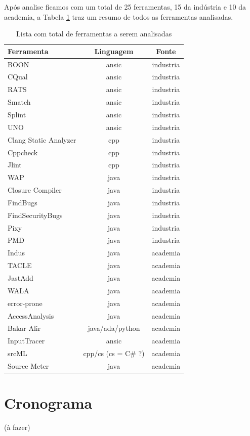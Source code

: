 \documentclass[qual, classic, a4paper]{ufbathesis}
\begin{document}

Após analise ficamos com um total de 25 ferramentas, 15 da indústria e 10 da
academia, a Tabela \ref{total-de-ferramentas} traz um resumo de todos as
ferramentas analisadas.

\begin{table}
\caption{Lista com total de ferramentas a serem analisadas}
\centering
\begin{tabular}{| l | c | c |}
\hline
Ferramenta & Linguagem & Fonte \\
\hline
BOON                  & ansic                & industria \\
CQual                 & ansic                & industria \\
RATS                  & ansic                & industria \\
Smatch                & ansic                & industria \\
Splint                & ansic                & industria \\
UNO                   & ansic                & industria \\
Clang Static Analyzer & cpp                  & industria \\
Cppcheck              & cpp                  & industria \\
Jlint                 & cpp                  & industria \\
WAP                   & java                 & industria \\
Closure Compiler      & java                 & industria \\
FindBugs              & java                 & industria \\
FindSecurityBugs      & java                 & industria \\
Pixy                  & java                 & industria \\
PMD                   & java                 & industria \\
Indus                 & java                 & academia  \\
TACLE                 & java                 & academia  \\
JastAdd               & java                 & academia  \\
WALA                  & java                 & academia  \\
error-prone           & java                 & academia  \\
AccessAnalysis        & java                 & academia  \\
Bakar Alir            & java/ada/python      & academia  \\
InputTracer           & ansic                & academia  \\
srcML                 & cpp/cs (cs = C\# ?)   & academia  \\
Source Meter          & java                 & academia  \\
\hline
\end{tabular}
\label{total-de-ferramentas}
\end{table}

\section{Cronograma}

(à fazer)

\backmatter
\appendix

\end{document}
